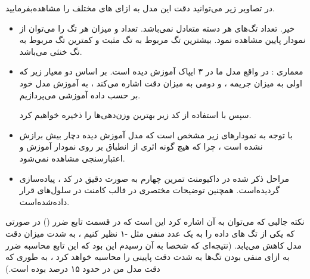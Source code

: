 \begin{boxC}
    در تصاویر زیر می‌توانید دقت‌ این مدل به ازای 
    های مختلف را مشاهده‌بفرمایید.

    \begin{itemize}
        \item 
        خیر. تعداد تگ‌های هر دسته متعادل نمی‌باشد.
        تعداد و میزان هر تگ را می‌توان از نمودار پایین مشاهده نمود.
        بیشترین تگ مربوط به تگ مثبت و کمترین تگ مربوط به تگ خنثی می‌باشد.


        \item 
        معماری :
        در واقع مدل ما در ۳ ایپاک آموزش دیده است.
        بر اساس دو معیار زیر که اولی به میزان جریمه ، و دومی به میزان دقت اشاره می‌کند ، به آموزش مدل خود بر حسب داده آموزشی می‌پردازیم.
        
        \newline

        سپس با استفاده از کد زیر بهترین وزن‌دهی‌ها را ذخیره خواهیم کرد.


        \item 
        با توجه به نمودارهای زیر مشخص است که مدل آموزش دیده دچار بیش برازش نشده است ، چرا که هیچ گونه اثری از انطباق بر روی نمودار آموزش و اعتبارسنجی مشاهده نمی‌شود.

        \item 
        مراحل ذکر شده در داکیومنت تمرین چهارم به صورت دقیق در کد ، پیاده‌سازی گردیده‌است.
        همچنین توضیحات مختصری در قالب کامنت در سلول‌های 
        قرار داده‌شده‌است.
        
    \end{itemize}
\end{boxC}

\begin{boxK}
    نکته جالبی که می‌توان به آن اشاره کرد این است که در قسمت تابع ضرر
    ()
    در صورتی که یکی از تگ های داده را به یک عدد منفی مثل -۱ نظیر کنیم ، به شدت میزان دقت مدل کاهش می‌یابد.
    (نتیجه‌ای که شخصا به آن رسیدم این بود که این تابع محاسبه ضرر به ازای منفی بودن تگ‌ها به شدت دقت پایینی را محاسبه خواهد کرد ، به طوری که دقت مدل من در حدود ۱۵ درصد بوده است.)
\end{boxK}

